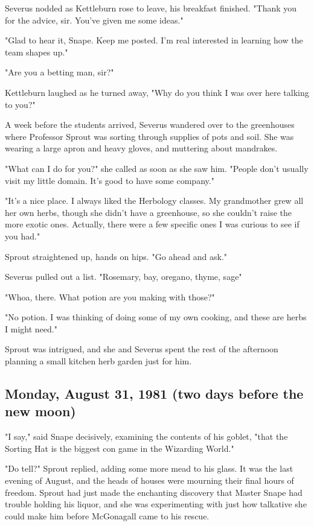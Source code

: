 Severus nodded as Kettleburn rose to leave, his breakfast finished. "Thank you for the advice, sir. You've given me some ideas."

"Glad to hear it, Snape. Keep me posted. I'm real interested in learning how the team shapes up."

"Are you a betting man, sir?"

Kettleburn laughed as he turned away, "Why do you think I was over here talking to you?"

A week before the students arrived, Severus wandered over to the greenhouses where Professor Sprout was sorting through supplies of pots and soil. She was wearing a large apron and heavy gloves, and muttering about mandrakes.

"What can I do for you?" she called as soon as she saw him. "People don't usually visit my little domain. It's good to have some company."

"It's a nice place. I always liked the Herbology classes. My grandmother grew all her own herbs, though she didn't have a greenhouse, so she couldn't raise the more exotic ones. Actually, there were a few specific ones I was curious to see if you had."

Sprout straightened up, hands on hips. "Go ahead and ask."

Severus pulled out a list. "Rosemary, bay, oregano, thyme, sage{\el}"

"Whoa, there. What potion are you making with those?"

"No potion. I was thinking of doing some of my own cooking, and these are herbs I might need."

Sprout was intrigued, and she and Severus spent the rest of the afternoon planning a small kitchen herb garden just for him.

\subsection{Monday, August 31, 1981 (two days before the new moon)}

"I say," said Snape decisively, examining the contents of his goblet, "that the Sorting Hat is the biggest con game in the Wizarding World."

"Do tell?" Sprout replied, adding some more mead to his glass. It was the last evening of August, and the heads of houses were mourning their final hours of freedom. Sprout had just made the enchanting discovery that Master Snape had trouble holding his liquor, and she was experimenting with just how talkative she could make him before McGonagall came to his rescue.

